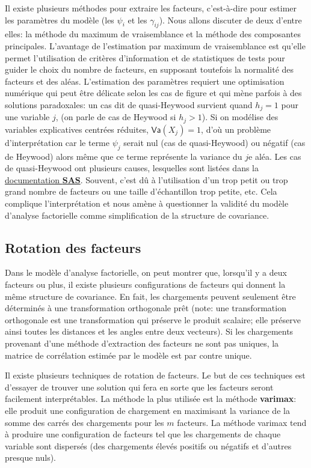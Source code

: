 \documentclass[
  11pt,
  letterpaper,
]{book}
\theoremstyle{definition}
\theoremstyle{definition}
\theoremstyle{definition}
\theoremstyle{definition}
\theoremstyle{remark}
\begin{document}
Il existe plusieurs méthodes pour extraire les facteurs, c'est-à-dire pour estimer les paramètres du modèle (les \(\psi_i\) et les \(\gamma_{ij}\)). Nous allons discuter de deux d'entre elles: la méthode du maximum de vraisemblance et la méthode des composantes principales. L'avantage de l'estimation par maximum de vraisemblance est qu'elle permet l'utilisation de critères d'information et de statistiques de tests pour guider le choix du nombre de facteurs, en supposant toutefois la normalité des facteurs et des aléas. L'estimation des paramètres requiert une optimisation numérique qui peut être délicate selon les cas de figure et qui mène parfois à des solutions paradoxales: un cas dit de quasi-Heywood survient quand \(h_j=1\) pour une variable \(j\), (on parle de cas de Heywood si \(h_j > 1\)). Si on modélise des variables explicatives centrées réduites, \(\mathsf{Va}(X_j)=1\), d'où un problème d'interprétation car le terme \(\psi_j\) serait nul (cas de quasi-Heywood) ou négatif (cas de Heywood) alors même que ce terme représente la variance du \(j\)e aléa. Les cas de quasi-Heywood ont plusieurs causes, lesquelles sont listées dans la \href{https://support.sas.com/documentation/cdl/en/statug/63033/HTML/default/viewer.htm\#statug_factor_sect022.htm}{documentation \textbf{SAS}}. Souvent, c'est dû à l'utilisation d'un trop petit ou trop grand nombre de facteurs ou une taille d'échantillon trop petite, etc. Cela complique l'interprétation et nous amène à questionner la validité du modèle d'analyse factorielle comme simplification de la structure de covariance.

\hypertarget{rotation-des-facteurs}{%
\subsection{Rotation des facteurs}\label{rotation-des-facteurs}}

Dans le modèle d'analyse factorielle, on peut montrer que, lorsqu'il y a deux facteurs ou plus, il existe plusieurs configurations de facteurs qui donnent la même structure de covariance. En fait, les chargements peuvent seulement être déterminés à une transformation orthogonale prêt (note: une transformation orthogonale est une transformation qui préserve le produit scalaire; elle préserve ainsi toutes les distances et les angles entre deux vecteurs). Si les chargements provenant d'une méthode d'extraction des facteurs ne sont pas uniques, la matrice de corrélation estimée par le modèle est par contre unique.

Il existe plusieurs techniques de rotation de facteurs. Le but de ces techniques est d'essayer de trouver une solution qui fera en sorte que les facteurs seront facilement interprétables. La méthode la plus utilisée est la méthode \textbf{varimax}: elle produit une configuration de chargement en maximisant la variance de la somme des carrés des chargements pour les \(m\) facteurs. La méthode varimax tend à produire une configuration de facteurs tel que les chargements de chaque variable sont dispersés (des chargements élevés positifs ou négatifs et d'autres presque nuls).
\end{document}
